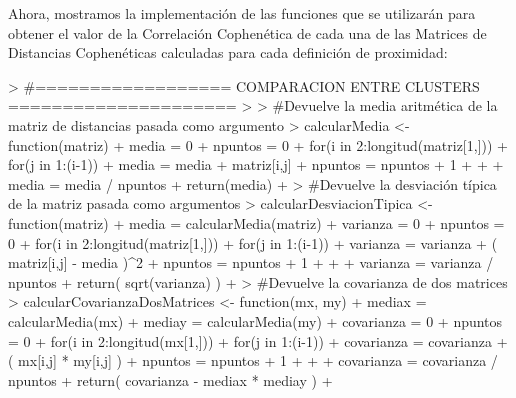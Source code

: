 \documentclass[parskip=full]{scrartcl}
\begin{document}
\begin{Schunk}
\begin{Sinput}
{{{{{{+             }
+             media = media / 
+             ( longitud( obtener_todos_puntos_cluster(clusters, clusters_totales[j])) * 
+             longitud( obtener_todos_puntos_cluster(clusters, clusters_totales[k]) ))
+             #Y las reemplazamos en la tabla de distancias cophenéticas
+             for(pc1 in puntos_cluster1){
+               for(pc2 in puntos_cluster2){
+                 if( mcd[pc1,pc2] > 0 ) { mcd[pc1,pc2] = media }
+                 if( mcd[pc2,pc1] > 0 ) { mcd[pc2,pc1] = media }
+               }
+             }
+           }
+         }
+       }
+       
+     }
+     
+   }
+   
+   #Fin del algoritmo, se muestran los clusters formados y la matriz de 
+   #distancias cophenéticas
+   print("Clusters: ")
+   print("")
+   mostrar_limpio_clusters(clusters)
+   print("")
+   print("Matriz de distancias cophenéticas: ")
+   print("")
+   print(mcd)
+   
+   return(mcd)
+ }
\end{Sinput}
\end{Schunk}


Ahora, mostramos la implementación de las funciones que se utilizarán para obtener el valor de la Correlación Cophenética de cada una de las Matrices de Distancias Cophenéticas calculadas para cada definición de proximidad:


\begin{Schunk}
\begin{Sinput}
> #================== COMPARACION ENTRE CLUSTERS =====================
> 
> #Devuelve la media aritmética de la matriz de distancias pasada como argumento
> calcularMedia <- function(matriz){
+   media = 0
+   npuntos = 0
+   for(i in 2:longitud(matriz[1,])){
+     for(j in 1:(i-1)){
+       media = media + matriz[i,j]
+       npuntos = npuntos + 1
+     }
+   }
+   media = media / npuntos
+   return(media)
+ }
> #Devuelve la desviación típica de la matriz pasada como argumentos
> calcularDesviacionTipica <- function(matriz){
+   media = calcularMedia(matriz)
+   varianza = 0
+   npuntos = 0
+   for(i in 2:longitud(matriz[1,])){
+     for(j in 1:(i-1)){
+       varianza = varianza + ( matriz[i,j] - media )^2
+       npuntos = npuntos + 1
+     }
+   }
+   varianza = varianza / npuntos
+   return( sqrt(varianza) )
+ }
> #Devuelve la covarianza de dos matrices
> calcularCovarianzaDosMatrices <- function(mx, my) {
+   mediax = calcularMedia(mx)
+   mediay = calcularMedia(my)
+   covarianza = 0
+   npuntos = 0
+   for(i in 2:longitud(mx[1,])){
+     for(j in 1:(i-1)){
+       covarianza = covarianza + ( mx[i,j] * my[i,j] )
+       npuntos = npuntos + 1
+     }
+   }
+   covarianza = covarianza / npuntos
+   return( covarianza - mediax * mediay )
+ }
\end{Sinput}
\end{Schunk}
\end{document}
